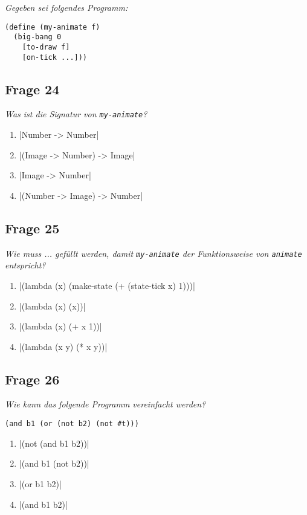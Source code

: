 \documentclass[a4paper, 11pt]{article}
\begin{document}
\begin{mdframed}
	\noindent\textit{Gegeben sei folgendes Programm:}
	\begin{verbatim}
(define (my-animate f)
  (big-bang 0
    [to-draw f]
    [on-tick ...]))
\end{verbatim}

	\subsection*{Frage 24}
	\textit{Was ist die Signatur von \texttt{my-animate}?}
	\begin{enumerate}[label=$\square$]
		\item {}|Number -> Number|
		\item {}|(Image -> Number) -> Image|
		\item {}|Image -> Number|
		\item {}|(Number -> Image) -> Number|
	\end{enumerate}

	\subsection*{Frage 25}
	\textit{Wie muss ... gefüllt werden, damit \texttt{my-animate} der Funktionsweise von \texttt{animate} entspricht?}
	\begin{enumerate}[label=$\square$]
		\item {}|(lambda (x) (make-state (+ (state-tick x) 1)))|
		\item {}|(lambda (x) (x))|
		\item {}|(lambda (x) (+ x 1))|
		\item {}|(lambda (x y) (* x y))|
	\end{enumerate}
\end{mdframed}

\subsection*{Frage 26}
\textit{Wie kann das folgende Programm vereinfacht werden?}
\begin{verbatim}
(and b1 (or (not b2) (not #t)))
\end{verbatim}
\begin{enumerate}[label=$\square$]
	\item {}|(not (and b1 b2))|
	\item {}|(and b1 (not b2))|
	\item {}|(or b1 b2)|
	\item {}|(and b1 b2)|
\end{enumerate}
\end{document}
